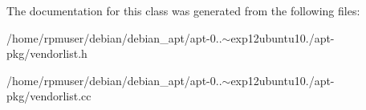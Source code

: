 \-The documentation for this class was generated from the following files\-:\begin{DoxyCompactItemize}
\item 
/home/rpmuser/debian/debian\-\_\-apt/apt-\/0..$\sim$exp12ubuntu10./apt-\/pkg/vendorlist.\-h\item 
/home/rpmuser/debian/debian\-\_\-apt/apt-\/0..$\sim$exp12ubuntu10./apt-\/pkg/vendorlist.\-cc\end{DoxyCompactItemize}
